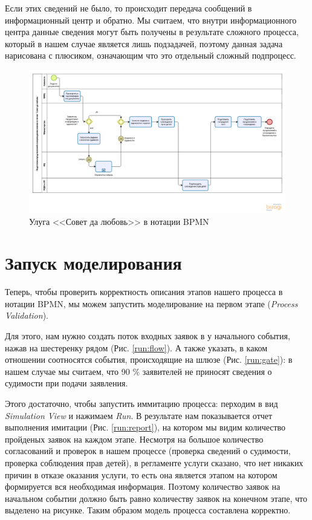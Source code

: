 Если этих сведений не было, то происходит передача сообщений
в информационный центр и обратно. Мы считаем, что внутри
информационного центра данные сведения могут быть получены
в результате сложного процесса, который в нашем случае
является лишь подзадачей, поэтому данная задача нарисована
с плюсиком, означающим что это отдельный сложный подпроцесс.

\begin{figure}
    \centering
    \includegraphics[width=\textwidth]{figures/model-description}
    \caption{Улуга <<Совет да любовь>> в нотации BPMN}
    \label{description}
\end{figure}

\clearpage
\section{Запуск моделирования}

Теперь, чтобы проверить корректность описания этапов нашего
процесса в нотации BPMN, мы можем запустить моделирование на
первом этапе (\textit{Process Validation}).

Для этого, нам нужно создать поток входных заявок в у
начального события, нажав на шестеренку рядом (Рис. \ref{run:flow}).
А также указать, в каком отношении соотносятся события,
происходящие на шлюзе (Рис. \ref{run:gate}): в нашем случае
мы считаем, что 90 \% заявителей не приносят сведения о судимости
при подачи заявления.
\clearpage


Этого достаточно, чтобы запустить иммитацию процесса: перходим
в вид \textit{Simulation View} и нажимаем \textit{Run}.
В результате нам показывается отчет выполнения имитации (Рис. \ref{run:report}),
на котором мы видим количество пройденых заявок на каждом этапе.
Несмотря на большое количество согласований и проверок в нашем
процессе (проверка сведений о судимости, проверка соблюдения
прав детей), в регламенте услуги сказано, что нет никаких причин
в отказе оказания услуги, то есть она является этапом на котором
формируется вся необходимая информация. Поэтому количество
заявок на начальном событии должно быть равно количеству
заявок на конечном этапе, что выделено на рисунке.
Таким образом модель процесса составлена корректно.

